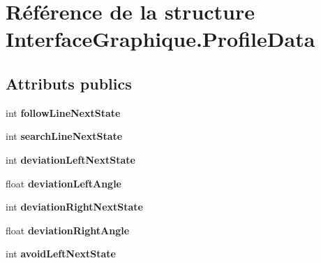\hypertarget{struct_interface_graphique_1_1_profile_data}{\section{Référence de la structure Interface\-Graphique.\-Profile\-Data}
\label{struct_interface_graphique_1_1_profile_data}
}
\subsection*{Attributs publics}
\begin{DoxyCompactItemize}
\item 
\hypertarget{struct_interface_graphique_1_1_profile_data_af19d8613b3949756855c47770bd11332}{int {\bfseries follow\-Line\-Next\-State}}\label{struct_interface_graphique_1_1_profile_data_af19d8613b3949756855c47770bd11332}

\item 
\hypertarget{struct_interface_graphique_1_1_profile_data_ab0fa4b8e4a4100b292793deb008bfff6}{int {\bfseries search\-Line\-Next\-State}}\label{struct_interface_graphique_1_1_profile_data_ab0fa4b8e4a4100b292793deb008bfff6}

\item 
\hypertarget{struct_interface_graphique_1_1_profile_data_a10bb2697d0525dd8ffa69fc9de41fcb7}{int {\bfseries deviation\-Left\-Next\-State}}\label{struct_interface_graphique_1_1_profile_data_a10bb2697d0525dd8ffa69fc9de41fcb7}

\item 
\hypertarget{struct_interface_graphique_1_1_profile_data_af3941d2f6a3a6d1907cfc618fe8bf650}{float {\bfseries deviation\-Left\-Angle}}\label{struct_interface_graphique_1_1_profile_data_af3941d2f6a3a6d1907cfc618fe8bf650}

\item 
\hypertarget{struct_interface_graphique_1_1_profile_data_a4a36a349d99f60bbc3c9b335bffaf203}{int {\bfseries deviation\-Right\-Next\-State}}\label{struct_interface_graphique_1_1_profile_data_a4a36a349d99f60bbc3c9b335bffaf203}

\item 
\hypertarget{struct_interface_graphique_1_1_profile_data_a708db16c7a9e7c7f40a36cec379c099c}{float {\bfseries deviation\-Right\-Angle}}\label{struct_interface_graphique_1_1_profile_data_a708db16c7a9e7c7f40a36cec379c099c}

\item 
\hypertarget{struct_interface_graphique_1_1_profile_data_a0cd3a8c05bae94e40caf939f195030a6}{int {\bfseries avoid\-Left\-Next\-State}}\label{struct_interface_graphique_1_1_profile_data_a0cd3a8c05bae94e40caf939f195030a6}


\end{DoxyCompactItemize}
